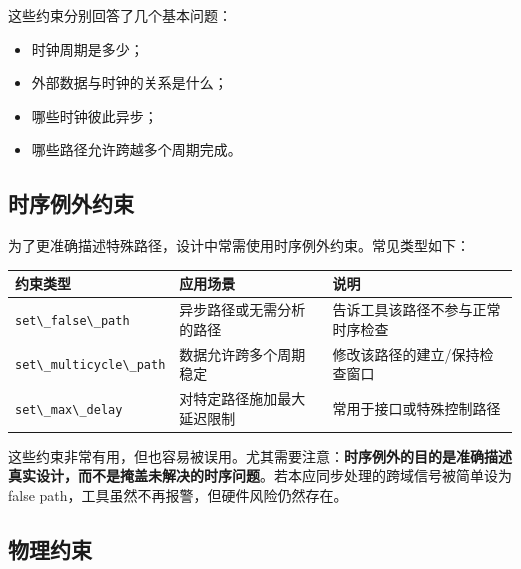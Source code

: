 这些约束分别回答了几个基本问题：

\begin{itemize}
\tightlist
\item
  时钟周期是多少；
\item
  外部数据与时钟的关系是什么；
\item
  哪些时钟彼此异步；
\item
  哪些路径允许跨越多个周期完成。
\end{itemize}

\subsection{时序例外约束}\label{ux65f6ux5e8fux4f8bux5916ux7ea6ux675f}

为了更准确描述特殊路径，设计中常需使用时序例外约束。常见类型如下：

\begin{longtable}[]{@{}
  >{\raggedright\arraybackslash}p{}
  >{\raggedright\arraybackslash}p{}
  >{\raggedright\arraybackslash}p{}@{}}
\toprule\noalign{}
\begin{minipage}[b]{\linewidth}\raggedright
约束类型
\end{minipage} & \begin{minipage}[b]{\linewidth}\raggedright
应用场景
\end{minipage} & \begin{minipage}[b]{\linewidth}\raggedright
说明
\end{minipage} \\
\midrule\noalign{}
\endhead
\bottomrule\noalign{}
\endlastfoot
\passthrough{\lstinline!set\_false\_path!} & 异步路径或无需分析的路径 &
告诉工具该路径不参与正常时序检查 \\
\passthrough{\lstinline!set\_multicycle\_path!} & 数据允许跨多个周期稳定
& 修改该路径的建立/保持检查窗口 \\
\passthrough{\lstinline!set\_max\_delay!} & 对特定路径施加最大延迟限制 &
常用于接口或特殊控制路径 \\
\end{longtable}

这些约束非常有用，但也容易被误用。尤其需要注意：\textbf{时序例外的目的是准确描述真实设计，而不是掩盖未解决的时序问题}。若本应同步处理的跨域信号被简单设为
false path，工具虽然不再报警，但硬件风险仍然存在。

\subsection{物理约束}\label{ux7269ux7406ux7ea6ux675f}

